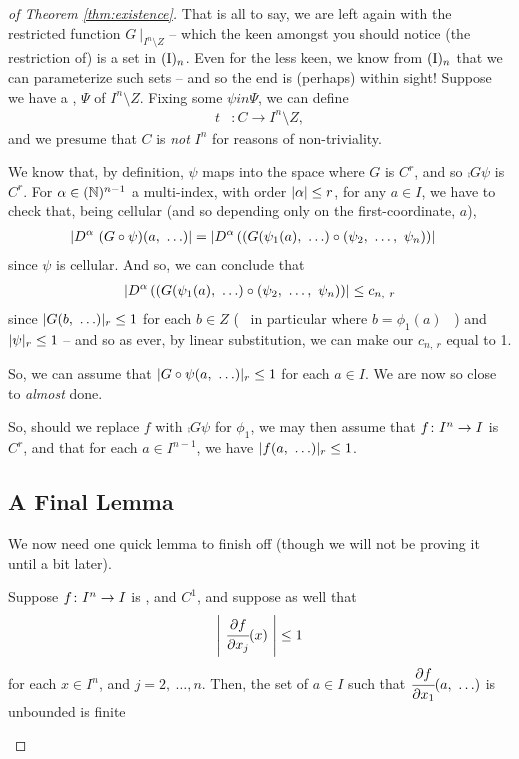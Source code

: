 \begin{proof}[of Theorem \ref{thm:existence}]
     That is all to say, we are left again with the restricted function $G \ \vert_{I^n \setminus Z}$ -- which the keen amongst you should notice (the restriction of) is a set in $\In[n]$. Even for the less keen, we know from $\In[n]$ that we can parameterize such sets -- and so the end is (perhaps) within sight! Suppose we have a \cellrparam, $\Psi$ of $I^n \setminus Z$. Fixing some $\psi in \Psi$, we can define
      \begin{align*}
        t &\colon C \to I^n \setminus Z,
      \end{align*}
    and we presume that $C$ is \emph{not} $I^n$ for reasons of non-triviality.

    We know that, by definition, $\psi$ maps into the space where $G$ is $C^r$, and so $\comp{G}{\psi}$ is $C^r$. For $\alpha \in (\N)^{n-1}$ a multi-index, with order $\abs{\alpha} \leq r$, for any $a \in I$, we have to check that, being cellular (and so depending only on the first-coordinate, $a$),
      \begin{align*}
        \abs{D^{\alpha} \ (\comp{G}{\psi})(a, \ \hdots)} &= \abs{D^{\alpha} \left( \comp{(G(\psi_1(a), \ \hdots)}{(\vmvn{\psi}{2}{n})} \right)}
      \end{align*}
    since $\psi$ is cellular. And so, we can conclude that
      \begin{align*}
        \abs{D^{\alpha} \left( \comp{(G(\psi_1(a), \ \hdots)}{(\vmvn{\psi}{2}{n})} \right)} \leq c_{n, \ r}
      \end{align*}
    since $\rnorm{G(b, \ \hdots)} \leq 1$ for each $b \in Z$ ( \ in particular where $b = \phi_1(a)$ \ ) and $\rnorm{\psi} \leq 1$ -- and so as ever, by linear substitution, we can make our $c_{n, \ r}$ equal to 1.

    So, we can assume that $\rnorm{\comp{G}{\psi}(a, \ \hdots)} \leq 1$ for each $a \in I$. We are now so close to \emph{almost} done.

    So, should we replace $f$ with $\comp{G}{\psi}$ for $\phi_1$, we may then assume that $\funcdom{f}{I^n}{I}$ is $C^r$, and that for each $a \in I^{n - 1}$, we have $\rnorm{f(a, \ \hdots)} \leq 1$.

    \subsection{A Final Lemma}

    We now need one quick lemma to finish off (though we will not be proving it until a bit later).
    \begin{lemma}
      Suppose $\funcdom{f}{I^n}{I}$ is , and $C^1$, and suppose as well that
      \begin{align*}
        \left\vert \ \cfrac{\partial f}{\partial x_j}(x) \ \right\vert \leq 1
      \end{align*}
      for each $x \in I^n$, and $j = 2, \ \hdots, n$. Then, the set of $a \in I$ such that $\cfrac{\partial f}{\partial x_1}(a, \ \hdots)$ is unbounded is finite


\end{lemma}
\end{proof}
